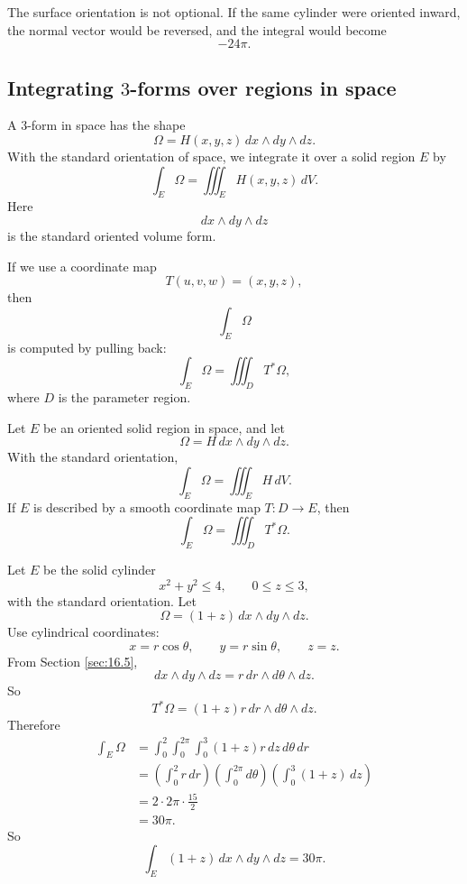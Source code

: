 The surface orientation is not optional.  If the same cylinder were oriented inward, the
normal vector would be reversed, and the integral would become
\[
    -24\pi.
\]

\subsection{Integrating \texorpdfstring{\(3\)}{3}-forms over regions in space}

A \(3\)-form in space has the shape
\[
    \Omega=H(x,y,z)\,dx\wedge dy\wedge dz.
\]
With the standard orientation of space, we integrate it over a solid region \(E\) by
\[
\boxed{
    \int_E \Omega
    =
    \iiint_E H(x,y,z)\,dV.
}
\]
Here
\[
    dx\wedge dy\wedge dz
\]
is the standard oriented volume form.

If we use a coordinate map
\[
    T(u,v,w)=(x,y,z),
\]
then
\[
    \int_E\Omega
\]
is computed by pulling back:
\[
\boxed{
    \int_E\Omega
    =
    \iiint_{D} T^*\Omega,
}
\]
where \(D\) is the parameter region.

\begin{definition}
Let \(E\) be an oriented solid region in space, and let
\[
    \Omega=H\,dx\wedge dy\wedge dz.
\]
With the standard orientation,
\[
\boxed{
    \int_E\Omega=\iiint_E H\,dV.
}
\]
If \(E\) is described by a smooth coordinate map \(T:D\to E\), then
\[
\boxed{
    \int_E\Omega=\iiint_D T^*\Omega.
}
\]
\end{definition}

\begin{example}
Let \(E\) be the solid cylinder
\[
    x^2+y^2\le4,
    \qquad
    0\le z\le3,
\]
with the standard orientation.  Let
\[
    \Omega=(1+z)\,dx\wedge dy\wedge dz.
\]
Use cylindrical coordinates:
\[
    x=r\cos\theta,
    \qquad
    y=r\sin\theta,
    \qquad
    z=z.
\]
From Section \ref{sec:16.5},
\[
    dx\wedge dy\wedge dz
    =
    r\,dr\wedge d\theta\wedge dz.
\]
So
\[
    T^*\Omega=(1+z)r\,dr\wedge d\theta\wedge dz.
\]
Therefore
\[
\begin{aligned}
    \int_E\Omega
    &=
    \int_0^2\int_0^{2\pi}\int_0^3
    (1+z)r\,dz\,d\theta\,dr\\
    &=
    \left(\int_0^2 r\,dr\right)
    \left(\int_0^{2\pi}d\theta\right)
    \left(\int_0^3(1+z)\,dz\right)\\
    &=
    2\cdot2\pi\cdot\frac{15}{2}\\
    &=
    30\pi.
\end{aligned}
\]
So
\[
\boxed{
    \int_E (1+z)\,dx\wedge dy\wedge dz=30\pi.
}
\]
\end{example}

